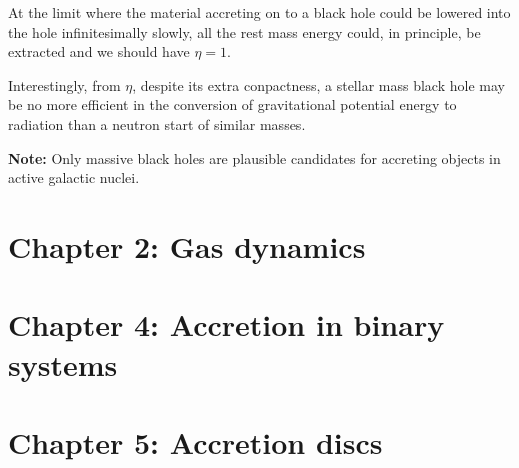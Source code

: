 \documentclass{article}
\begin{document}
At the limit where the material accreting on to a black hole could be lowered into the hole 
infinitesimally slowly, all the rest mass energy could, in principle, be extracted and we should have
$\eta = 1$. 

Interestingly, from $\eta$, despite its extra conpactness, a stellar mass black hole may be no more
efficient in the conversion of gravitational potential energy to radiation than a neutron start of similar masses.

\vbox{}

\textbf{Note:} Only massive black holes are plausible candidates for accreting objects in active galactic nuclei.



\section{Chapter 2: Gas dynamics}


\section{Chapter 4: Accretion in binary systems}


\section{Chapter 5: Accretion discs}
\end{document}
